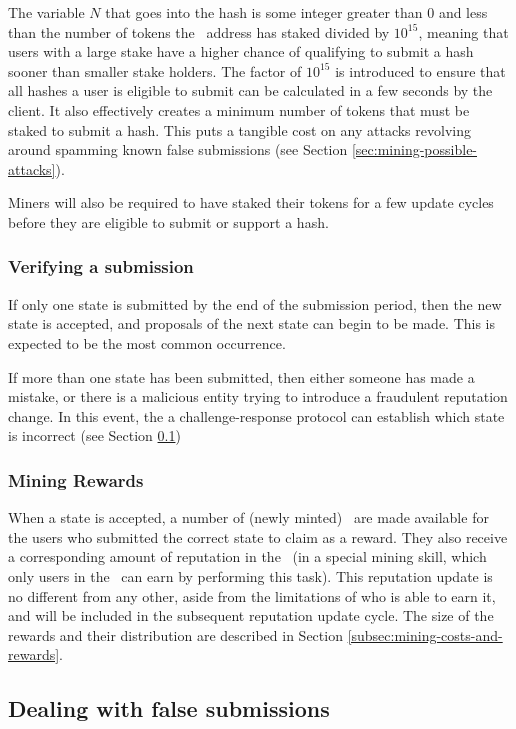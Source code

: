 The variable $N$ that goes into the hash is some integer greater than 0 and less than the number of tokens the \rcth\ address has staked divided by $10^{15}$, meaning that users with a large stake have a higher chance of qualifying to submit a hash sooner than smaller stake holders. The factor of $10^{15}$ is introduced to ensure that all hashes a user is eligible to submit can be calculated in a few seconds by the client. It also effectively creates a minimum number of tokens that must be staked to submit a hash. This puts a tangible cost on any attacks revolving around spamming known false submissions (see Section \ref{sec:mining-possible-attacks}). 

Miners will also be required to have staked their tokens for a few update cycles before they are eligible to submit or support a hash.
%
\subsubsection*{Verifying a submission}
If only one state is submitted by the end of the submission period, then the new state is accepted, and proposals of the next state can begin to be made. This is expected to be the most common occurrence.

If more than one state has been submitted, then either someone has made a mistake, or there is a malicious entity trying to introduce a fraudulent reputation change. In this event, the a challenge-response protocol can establish which state is incorrect (see Section \ref{sec:challengeresponse})

\subsubsection*{Mining Rewards}

When a state is accepted, a number of (newly minted) \rcts\ are made available for the users who submitted the correct state to claim as a reward. They also receive a corresponding amount of reputation in the \rc\ (in a special mining skill, which only users in the \rc\ can earn by performing this task). This reputation update is no different from any other, aside from the limitations of who is able to earn it, and will be included in the subsequent reputation update cycle. The size of the rewards and their distribution are described in Section \ref{subsec:mining-costs-and-rewards}.

\subsection{Dealing with false submissions}\label{sec:challengeresponse}
%
